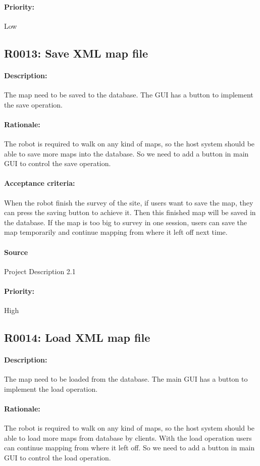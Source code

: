 \documentclass[11pt, a4paper]{report}
\begin{document}
\paragraph{Priority:}
Low



\subsection{R0013: Save XML map file}
\paragraph{Description:}
The map need to be saved to the database. The GUI has a button to implement the save operation. 
\paragraph{Rationale:}
The robot is required to walk on any kind of maps, so the host system should be able to save more maps into the database. So we need to add a button in main GUI to control the save operation.
\paragraph{Acceptance criteria:}
When the robot finish the survey of the site, if users want to save the map, they can press the saving button to achieve it.  Then this finished map will be saved in the database. If the map is too big to survey in one session, users can save the map temporarily and continue mapping from where it left off next time.
\paragraph{Source}
 Project Description 2.1
\paragraph{Priority:}
High




\subsection{R0014: Load XML map file}
\paragraph{Description:}
The map need to be loaded from the database. The main GUI has a button to implement the load operation. 
\paragraph{Rationale:}
The robot is required to walk on any kind of maps, so the host system should be able to load more maps from database by clients. With the load operation users can continue mapping from where it left off.  So we need to add a button in main GUI to control the load operation.
\end{document}
